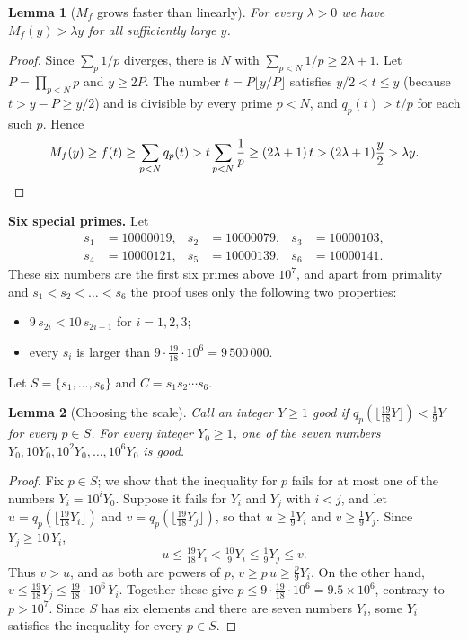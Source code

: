 \documentclass[11pt,a4paper]{amsart}
\newtheorem{lemma}{Lemma}
\theoremstyle{remark}
\begin{document}
\begin{lemma}[$M_f$ grows faster than linearly]\label{lem:superlinear}
For every $\lambda > 0$ we have $M_f(y) > \lambda y$ for all sufficiently large $y$.
\end{lemma}

\begin{proof}
Since $\sum_p 1/p$ diverges, there is $N$ with $\sum_{p < N} 1/p \ge 2\lambda + 1$. Let $P = \prod_{p < N} p$ and $y \ge 2P$. The number $t = P \lfloor y/P \rfloor$ satisfies $y/2 < t \le y$ (because $t > y - P \ge y/2$) and is divisible by every prime $p < N$, and $q_p(t) > t/p$ for each such $p$. Hence
\[
M_f(y) \ge f(t) \ge \sum_{p < N} q_p(t) > t \sum_{p < N} \frac{1}{p} \ge (2\lambda + 1)\, t > (2\lambda + 1) \frac{y}{2} > \lambda y. \qedhere
\]
\end{proof}

\medskip
\noindent\textbf{Six special primes.} Let
\[
\begin{aligned}
s_1 &= 10000019, & s_2 &= 10000079, & s_3 &= 10000103, \\
s_4 &= 10000121, & s_5 &= 10000139, & s_6 &= 10000141.
\end{aligned}
\]
These six numbers are the first six primes above $10^7$, and apart from primality and $s_1 < s_2 < \dots < s_6$ the proof uses only the following two properties:
\begin{itemize}
\item $9\, s_{2i} < 10\, s_{2i - 1}$ for $i = 1, 2, 3$;
\item every $s_i$ is larger than $9 \cdot \frac{19}{18} \cdot 10^6 = 9\,500\,000$.
\end{itemize}
Let $S = \{s_1, \dots, s_6\}$ and $C = s_1 s_2 \cdots s_6$.

\begin{lemma}[Choosing the scale]\label{lem:scale}
Call an integer $Y \ge 1$ \emph{good} if $q_p(\lfloor \tfrac{19}{18} Y \rfloor) < \tfrac{1}{9} Y$ for every $p \in S$. For every integer $Y_0 \ge 1$, one of the seven numbers $Y_0, 10 Y_0, 10^2 Y_0, \dots, 10^6 Y_0$ is good.
\end{lemma}

\begin{proof}
Fix $p \in S$; we show that the inequality for $p$ fails for at most one of the numbers $Y_i = 10^i Y_0$. Suppose it fails for $Y_i$ and $Y_j$ with $i < j$, and let $u = q_p(\lfloor \frac{19}{18} Y_i \rfloor)$ and $v = q_p(\lfloor \frac{19}{18} Y_j \rfloor)$, so that $u \ge \frac{1}{9} Y_i$ and $v \ge \frac{1}{9} Y_j$. Since $Y_j \ge 10\, Y_i$,
\[
u \le \tfrac{19}{18} Y_i < \tfrac{10}{9} Y_i \le \tfrac{1}{9} Y_j \le v.
\]
Thus $v > u$, and as both are powers of $p$, $v \ge p\, u \ge \frac{p}{9} Y_i$. On the other hand, $v \le \frac{19}{18} Y_j \le \frac{19}{18} \cdot 10^6\, Y_i$. Together these give $p \le 9 \cdot \frac{19}{18} \cdot 10^6 = 9.5 \times 10^6$, contrary to $p > 10^7$. Since $S$ has six elements and there are seven numbers $Y_i$, some $Y_i$ satisfies the inequality for every $p \in S$.
\end{proof}
\end{document}

